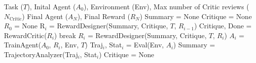 \begin{algorithm}[!tb]
\footnotesize
    \caption{\small{Auto MC-Reward Training Pseudo Code}}
    \label{alg}
    \begin{algorithmic}
        \REQUIRE Task ($T$), Inital Agent ($A_0$), Environment (Env), Max  number of Critic reviews ($N_\text{Critic}$)
        \ENSURE Final Agent ($A_N$), Final Reward ($R_N$)
        \STATE Summary = None
        \STATE Critique = None
        \STATE $R_0$ = None
            \STATE R$_i$ = RewardDesigner(Summary, Critique, $T$, $R_{i-1}$)
                \STATE Critique, Done = RewardCritic($R_i$)
                    \STATE break
                \ELSE
                    \STATE $R_i$ = RewardDesigner(Summary, Critique, $T$, $R_{i}$)
                \ENDIF
            \ENDFOR
            \STATE $A_i$ = TrainAgent($A_0$, $R_{i}$, Env, $T$)
            \STATE Traj$_i$, Stat$_i$ = Eval(Env, $A_i$)
            \STATE Summary = TrajectoryAnalyzer(Traj$_i$, Stat$_i$)
            \STATE Critique = None
        \ENDFOR
    \end{algorithmic}
    \label{alg:pseudo}
\end{algorithm}





